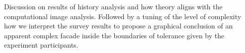 
Discussion on results of history analysis and how theory aligns with the computational image analysis.
Followed by a tuning of the level of complexity how we interpret the survey results to propose a graphical conclusion of an apparent complex facade inside the boundaries of tolerance given by the experiment participants.